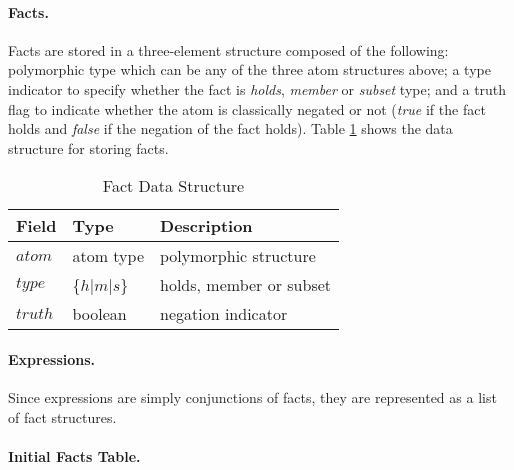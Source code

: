 \documentclass[11pt]{report}
\begin{document}
          \paragraph{Facts.}

            Facts are stored in a three-element structure composed of the
            following: polymorphic type which can be any of the three atom
            structures above; a type indicator to specify whether the fact is
            {\em holds}, {\em member} or {\em subset} type; and a truth flag
            to indicate whether the atom is classically negated or not
            ({\em true} if the fact holds and {\em false} if the negation of
            the fact holds). Table \ref{tabl-polup-fadsr} shows the data
            structure for storing facts.

            \begin{table}[tbhp]
              \begin{center}
                \begin{tabular}[t]{|l|l|l|}
                  \hline
                  \textbf{Field} & \textbf{Type}       & \textbf{Description} \\
                  \hline
                  $atom$         & atom type           & polymorphic structure \\
                  \hline
                  $type$         & \{$h$$|$$m$$|$$s$\} & holds, member or subset \\
                  \hline
                  $truth$        & boolean             & negation indicator \\
                  \hline
                \end{tabular}
              \end{center}
              \caption{Fact Data Structure}
              \label{tabl-polup-fadsr}
            \end{table}

          \paragraph{Expressions.}

            Since expressions are simply conjunctions of facts, they are
            represented as a list of fact structures.

          \paragraph{Initial Facts Table.}
\end{document}
